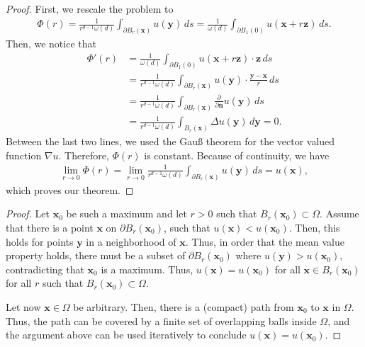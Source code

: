 




\begin{proof}
  First, we rescale the problem to
  \begin{gather*}
    \Phi(r) = \frac1{r^{d-1}\omega(d)}
    \int_{\partial B_r(\mathbf x)} u(\mathbf y) \,ds
    = \frac1{\omega(d)} \int_{\partial B_1(0)} u(\mathbf x+r\mathbf z) \,ds.
  \end{gather*}
  Then, we notice that
  \begin{align*}
    \Phi'(r)
    &= \frac1{\omega(d)} \int_{\partial B_1(0)} u(\mathbf x+r\mathbf z)\cdot \mathbf z \,ds\\
    &= \frac1{r^{d-1}\omega(d)} \int_{\partial B_r(\mathbf x)}
    u(\mathbf y)\cdot\frac{\mathbf y-\mathbf x}{r} \,ds\\
    &= \frac1{r^{d-1}\omega(d)} \int_{\partial B_r(\mathbf x)}
    \frac{\partial}{\partial \mathbf n} u(\mathbf y) \,ds\\
    &= \frac1{r^{d-1}\omega(d)} \int_{B_r(\mathbf x)}
    \Delta u(\mathbf y)\,d\mathbf y = 0.
  \end{align*}
  Between the last two lines, we used the Gauß theorem for the vector
  valued function $\nabla u$. Therefore, $\Phi(r)$ is
  constant. Because of continuity, we have
  \begin{gather*}
    \lim_{r\to 0} \Phi(r) =
    \lim_{r\to 0}\frac1{r^{d-1}\omega(d)} \int_{\partial B_r(\mathbf x)} u(\mathbf y)
    \,ds
    = u(\mathbf x),
  \end{gather*}
  which proves our theorem.
\end{proof}



\begin{proof}
  Let $\mathbf x_0$ be such a maximum and let $r>0$ such that
  $B_r(\mathbf x_0) \subset \Omega$. Assume that there is a point
  $\mathbf x$ on $\partial B_r(\mathbf x_0)$, such that $u(\mathbf x)
  < u(\mathbf x_0)$. Then, this holds for points $\mathbf y$ in a
  neighborhood of $\mathbf x$. Thus, in order that the mean value
  property holds, there must be a subset of $\partial B_r(\mathbf
  x_0)$ where $u(\mathbf y) > u(\mathbf x_0)$, contradicting that
  $\mathbf x_0$ is a maximum. Thus, $u(\mathbf x) = u(\mathbf x_0)$
  for all $\mathbf x \in B_r(\mathbf x_0)$ for all $r$ such that
  $B_r(\mathbf x_0) \subset \Omega$.

  Let now $\mathbf x\in \Omega$ be arbitrary. Then, there is a
  (compact) path from $\mathbf x_0$ to $\mathbf x$ in $\Omega$. Thus,
  the path can be covered by a finite set of overlapping balls inside
  $\Omega$, and the argument above can be used iteratively to conclude
  $u(\mathbf x) = u(\mathbf x_0)$.
\end{proof}

